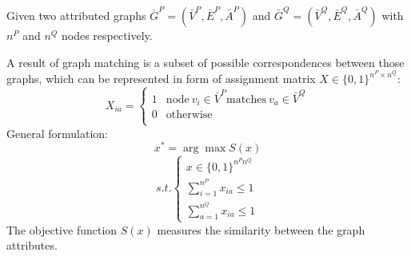 \documentclass[hyperref={pdfpagelabels=false}]{beamer}
\begin{document}
\begin{frame}
Given two attributed graphs $\bar{G}^P=(\bar{V}^P, \bar{E}^P, \bar{A}^P)$ and $\bar{G}^Q=(\bar{V}^Q, \bar{E}^Q, \bar{A}^Q)$ with $n^P$ and $n^Q$ nodes respectively.

A result of graph matching is a subset of possible correspondences between those graphs, which can be represented in form of assignment matrix $X\in\{0,1\}^{n^P\times n^Q}$:
$$X_{ia} = \begin{cases} 1 & \mbox{node}\ v_i\in \bar{V}^P \mbox{matches}\ v_a \in \bar{V}^Q \\
						 0 & \mbox{otherwise} \\
			\end{cases}$$
General formulation:
$$x^* = \arg\max S(x)$$
$$ s.t. \begin{cases}
									x\in\{0,1\}^{n^Pn^Q} \\
								 \sum_{i=1}^{n^P}x_{ia}\le 1 \\
								 \sum_{a=1}^{n^Q}x_{ia}\le 1  \end{cases}$$
The objective function $S(x)$ measures the similarity between the graph attributes. 
\end{frame} 

\end{document}
